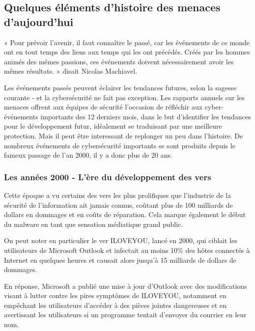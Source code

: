 

\subsection{Quelques éléments d'histoire des menaces d'aujourd'hui}

« Pour prévoir l'avenir, il faut connaître le passé, car les événements de ce monde ont en tout temps des liens aux temps qui les ont précédés. Créés par les hommes animés des mêmes passions, ces événements doivent nécessairement avoir les mêmes résultats. » disait Nicolas Machiavel.

 Les événements passés peuvent éclairer les tendances futures, selon la sagesse courante - et la cybersécurité ne fait pas exception.
Les rapports annuels sur les menaces offrent aux équipes de sécurité l'occasion de réfléchir aux cyber-événements importants des 12 derniers mois, dans le but d'identifier les tendances pour le développement futur, idéalement se traduisant par une meilleure protection. Mais il peut être interessant de replonger un peu dans l'histoire.
De nombreux événements de cybersécurité importants se sont produits depuis le fameux passage de l’an 2000, il y a donc plus de 20 ans.

\subsubsection{Les années 2000 - L'ère du développement des vers}
Cette époque a vu certains des vers les plus prolifiques que l'industrie de la sécurité de l'information ait jamais connus, coûtant plus de 100 milliards de dollars en dommages et en coûts de réparation. Cela marque également le début du malware en tant que sensation médiatique grand public.

On peut noter  en particulier le ver ILOVEYOU, lancé en 2000, qui ciblait les utilisateurs de Microsoft Outlook et infectait au moins 10\% des hôtes connectés à Internet en quelques heures et causait alors jusqu'à 15 milliards de dollars de dommages.

En réponse, Microsoft a publié une mise à jour d'Outlook avec des modifications visant à lutter contre les pires symptômes de ILOVEYOU, notamment en empêchant les utilisateurs d'accéder à des pièces jointes dangereuses et en avertissant les utilisateurs si un programme tentait d'envoyer du courrier en leur nom.

